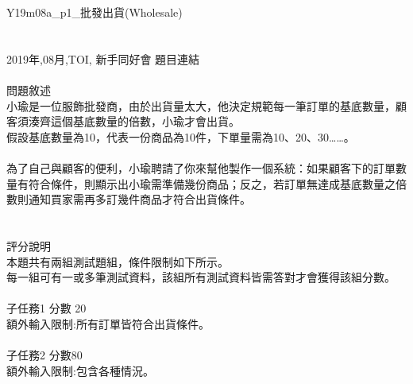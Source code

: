 Y19m08a_p1_批發出貨(Wholesale)\\
\\
\\
 2019年,08月,TOI, 新手同好會 {題目連結}\\
\\
問題敘述\\
小瑜是一位服飾批發商，由於出貨量太大，他決定規範每一筆訂單的基底數量，顧客須湊齊這個基底數量的倍數，小瑜才會出貨。\\
假設基底數量為10，代表一份商品為10件，下單量需為10、20、30……。\\
\\
為了自己與顧客的便利，小瑜聘請了你來幫他製作一個系統：如果顧客下的訂單數量有符合條件，則顯示出小瑜需準備幾份商品；反之，若訂單無達成基底數量之倍數則通知買家需再多訂幾件商品才符合出貨條件。\\
\\
\\
評分說明\\
本題共有兩組測試題組，條件限制如下所示。\\
每一組可有一或多筆測試資料，該組所有測試資料皆需答對才會獲得該組分數。\\
\\
子任務1 分數 20\\
 額外輸入限制:所有訂單皆符合出貨條件。\\
\\
子任務2 分數80\\
 額外輸入限制:包含各種情況。\\
